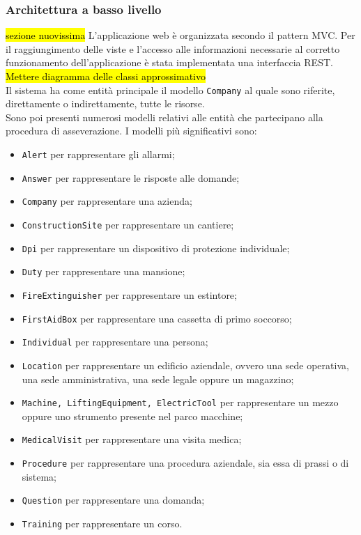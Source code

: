 \subsubsection{Architettura a basso livello}
\hl{sezione nuovissima}
L'applicazione web è organizzata secondo il pattern \gls{MVC}. Per il raggiungimento delle viste e l'accesso alle informazioni necessarie al corretto funzionamento dell'applicazione è stata implementata una interfaccia \gls{REST}. \\
\hl{Mettere diagramma delle classi approssimativo}\\
Il sistema ha come entità principale il modello \texttt{Company} al quale sono riferite, direttamente o indirettamente, tutte le risorse.\\ 
Sono poi presenti numerosi modelli relativi alle entità che partecipano alla procedura di \gls{asseverazione}.
I modelli più significativi sono:
\begin{itemize} 
	\item \texttt{Alert} per rappresentare gli allarmi;
	\item \texttt{Answer} per rappresentare le risposte alle domande;
	\item \texttt{Company} per rappresentare una azienda;
	\item \texttt{ConstructionSite} per rappresentare un cantiere;
	\item \texttt{Dpi} per rappresentare un dispositivo di protezione individuale;
	\item \texttt{Duty} per rappresentare una mansione;
	\item \texttt{FireExtinguisher}  per rappresentare un estintore;
	\item \texttt{FirstAidBox} per rappresentare una cassetta di primo soccorso;
	\item \texttt{Individual} per rappresentare una persona;
	\item \texttt{Location} per rappresentare un edificio aziendale, ovvero una sede operativa, una sede amministrativa, una sede legale oppure un magazzino;
	\item \texttt{Machine, LiftingEquipment, ElectricTool}  per rappresentare un mezzo oppure uno strumento presente nel parco macchine;
	\item \texttt{MedicalVisit} per rappresentare una visita medica;
	\item \texttt{Procedure} per rappresentare una procedura aziendale, sia essa di prassi o di sistema;
	\item \texttt{Question} per rappresentare una domanda;
	\item \texttt{Training} per rappresentare un corso.
\end{itemize}	

